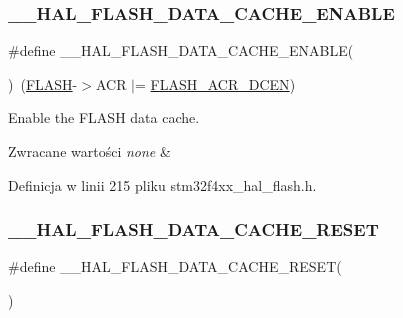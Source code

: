 \subsubsection{\texorpdfstring{\+\_\+\+\_\+\+H\+A\+L\+\_\+\+F\+L\+A\+S\+H\+\_\+\+D\+A\+T\+A\+\_\+\+C\+A\+C\+H\+E\+\_\+\+E\+N\+A\+B\+LE}{\_\_HAL\_FLASH\_DATA\_CACHE\_ENABLE}}
{\footnotesize\ttfamily \#define \+\_\+\+\_\+\+H\+A\+L\+\_\+\+F\+L\+A\+S\+H\+\_\+\+D\+A\+T\+A\+\_\+\+C\+A\+C\+H\+E\+\_\+\+E\+N\+A\+B\+LE(\begin{DoxyParamCaption}{ }\end{DoxyParamCaption})~(\hyperlink{group___peripheral__declaration_ga844ea28ba1e0a5a0e497f16b61ea306b}{F\+L\+A\+SH}-\/$>$A\+CR $\vert$= \hyperlink{group___peripheral___registers___bits___definition_ga5a9a5cc3aa05dc62264addab1008c896}{F\+L\+A\+S\+H\+\_\+\+A\+C\+R\+\_\+\+D\+C\+EN})}



Enable the F\+L\+A\+SH data cache. 


\begin{DoxyRetVals}{Zwracane wartości}
{\em none} & \\
\hline
\end{DoxyRetVals}


Definicja w linii 215 pliku stm32f4xx\+\_\+hal\+\_\+flash.\+h.

\mbox{\label{group___f_l_a_s_h___exported___macros_ga3b94f4f103ddab361802c8defd3a9c34}} 
\subsubsection{\texorpdfstring{\+\_\+\+\_\+\+H\+A\+L\+\_\+\+F\+L\+A\+S\+H\+\_\+\+D\+A\+T\+A\+\_\+\+C\+A\+C\+H\+E\+\_\+\+R\+E\+S\+ET}{\_\_HAL\_FLASH\_DATA\_CACHE\_RESET}}
{\footnotesize\ttfamily \#define \+\_\+\+\_\+\+H\+A\+L\+\_\+\+F\+L\+A\+S\+H\+\_\+\+D\+A\+T\+A\+\_\+\+C\+A\+C\+H\+E\+\_\+\+R\+E\+S\+ET(\begin{DoxyParamCaption}{ }\end{DoxyParamCaption})}

